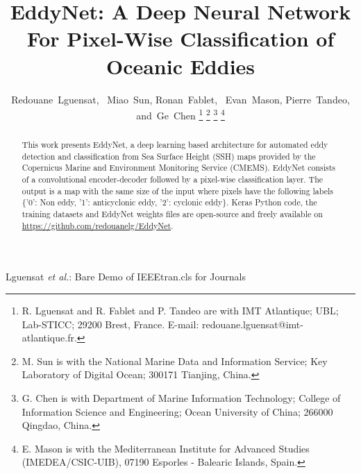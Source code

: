 \documentclass[journal]{IEEEtran}
\begin{document}
\title{EddyNet: A Deep Neural Network For Pixel-Wise Classification of Oceanic Eddies}

\author{Redouane~Lguensat,~
		Miao~Sun, %
        Ronan~Fablet,~  
        Evan~Mason, %
        Pierre~Tandeo, %
        and~Ge~Chen%
\thanks{R. Lguensat and R. Fablet and P. Tandeo are with IMT Atlantique; UBL; Lab-STICC; 29200 Brest, France. E-mail: redouane.lguensat@imt-atlantique.fr.}%
\thanks{M. Sun is with the National Marine Data and Information Service; Key Laboratory of Digital Ocean; 300171 Tianjing, China.}%
\thanks{G. Chen is with Department of Marine Information Technology; College of Information Science and Engineering; Ocean University of China; 266000 Qingdao, China.}%
\thanks{E. Mason is with the Mediterranean Institute for Advanced Studies (IMEDEA/CSIC-UIB), 07190 Esporles - Balearic Islands, Spain.}%

}




%
{Lguensat \MakeLowercase{\textit{et al.}}: Bare Demo of IEEEtran.cls for Journals}











\maketitle

\begin{abstract}
This work presents EddyNet, a deep learning based architecture for automated eddy detection and classification from Sea Surface Height (SSH) maps provided by the Copernicus Marine and Environment Monitoring Service (CMEMS). EddyNet consists of a convolutional encoder-decoder followed by a pixel-wise classification layer. The output is a map with the same size of the input where pixels have the following labels \{'0': Non eddy, '1': anticyclonic eddy, '2': cyclonic eddy\}. Keras Python code, the training datasets and EddyNet weights files are open-source and freely available on \url{https://github.com/redouanelg/EddyNet}.

\end{abstract}
\end{document}

